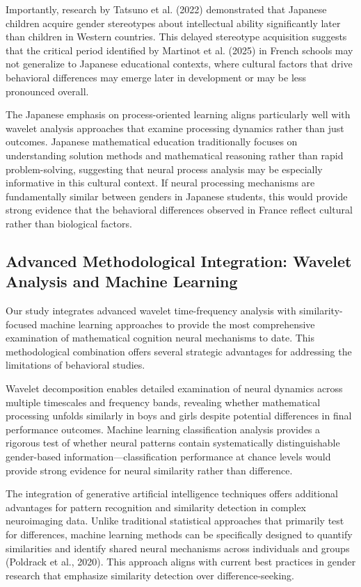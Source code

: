 \documentclass[pdflatex,reference]{sn-jnl}%
\theoremstyle{thmstyleone}%
\theoremstyle{thmstyletwo}%
\theoremstyle{thmstylethree}%
\begin{document}
Importantly, research by Tatsuno et al. (2022) demonstrated that Japanese children acquire gender stereotypes about intellectual ability significantly later than children in Western countries. This delayed stereotype acquisition suggests that the critical period identified by Martinot et al. (2025) in French schools may not generalize to Japanese educational contexts, where cultural factors that drive behavioral differences may emerge later in development or may be less pronounced overall.

The Japanese emphasis on process-oriented learning aligns particularly well with wavelet analysis approaches that examine processing dynamics rather than just outcomes. Japanese mathematical education traditionally focuses on understanding solution methods and mathematical reasoning rather than rapid problem-solving, suggesting that neural process analysis may be especially informative in this cultural context. If neural processing mechanisms are fundamentally similar between genders in Japanese students, this would provide strong evidence that the behavioral differences observed in France reflect cultural rather than biological factors.


\subsection{Advanced Methodological Integration: Wavelet Analysis and Machine Learning}
Our study integrates advanced wavelet time-frequency analysis with similarity-focused machine learning approaches to provide the most comprehensive examination of mathematical cognition neural mechanisms to date. This methodological combination offers several strategic advantages for addressing the limitations of behavioral studies.

Wavelet decomposition enables detailed examination of neural dynamics across multiple timescales and frequency bands, revealing whether mathematical processing unfolds similarly in boys and girls despite potential differences in final performance outcomes. Machine learning classification analysis provides a rigorous test of whether neural patterns contain systematically distinguishable gender-based information—classification performance at chance levels would provide strong evidence for neural similarity rather than difference.

The integration of generative artificial intelligence techniques offers additional advantages for pattern recognition and similarity detection in complex neuroimaging data. Unlike traditional statistical approaches that primarily test for differences, machine learning methods can be specifically designed to quantify similarities and identify shared neural mechanisms across individuals and groups (Poldrack et al., 2020). This approach aligns with current best practices in gender research that emphasize similarity detection over difference-seeking.
\end{document}
